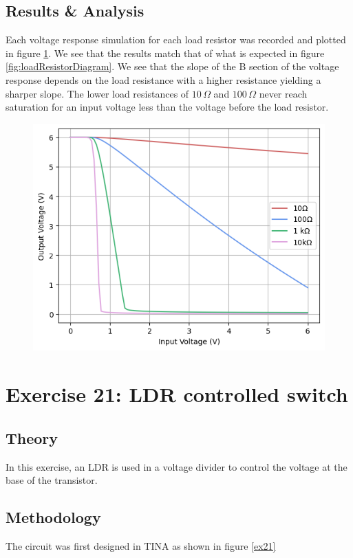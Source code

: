 \documentclass[%
reprint,
amsmath,amssymb,
aps,
floatfix
]{revtex4-2}
\begin{document}
		\subsection{Results \& Analysis}
		
		Each voltage response simulation for each load resistor was recorded and plotted in figure \ref{fig:ex20Results}. We see that the results match that of what is expected in figure \ref{fig:loadResistorDiagram}. We see that the slope of the B section of the voltage response depends on the load resistance with a higher resistance yielding a sharper slope. The lower load resistances of $10\,\Omega$ and $100\,\Omega$ never reach saturation for an input voltage less than the voltage before the load resistor.
		
		\begin{figure}
			\includegraphics[width=0.85\columnwidth]{ex20Results}
			\caption{\label{fig:ex20Results}}
		\end{figure}
		
	\section{Exercise 21: LDR controlled switch}
		\subsection{Theory}
		In this exercise, an LDR is used in a voltage divider to control the voltage at the base of the transistor.
		
		\subsection{Methodology}
		The circuit was first designed in TINA as shown in figure \ref{ex21}
		
\end{document}
